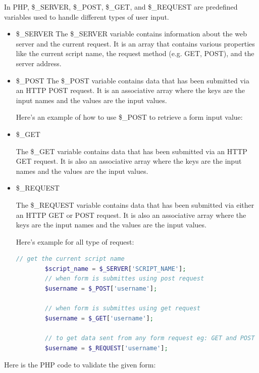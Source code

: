 \documentclass[11pt]{article}
\begin{document}
In PHP, \$\_SERVER, \$\_POST, \$\_GET, and \$\_REQUEST are predefined variables used to handle different types of user input.
\begin{itemize}
    \item \$\_SERVER 
    The \$\_SERVER variable contains information about the web server and the current request. It is an array that contains various properties like the current script name, the request method (e.g. GET, POST), and the server address.
    
    \item \$\_POST
    The \$\_POST variable contains data that has been submitted via an HTTP POST request. It is an associative array where the keys are the input names and the values are the input values.
    
    Here's an example of how to use \$\_POST to retrieve a form input value:
    
    \item \$\_GET
    
    The \$\_GET variable contains data that has been submitted via an HTTP GET request. It is also an associative array where the keys are the input names and the values are the input values.
    
    \item \$\_REQUEST
    
    The \$\_REQUEST variable contains data that has been submitted via either an HTTP GET or POST request. It is also an associative array where the keys are the input names and the values are the input values.
    
    Here's example for all type of request:
    
    \begin{lstlisting}[language=php]
        // get the current script name
        $script_name = $_SERVER['SCRIPT_NAME'];
        // when form is submittes using post request
        $username = $_POST['username'];
        
        // when form is submittes using get request
        $username = $_GET['username'];

        // to get data sent from any form request eg: GET and POST
        $username = $_REQUEST['username'];

    \end{lstlisting}

\end{itemize}

Here is the PHP code to validate the given form:
\end{document}
